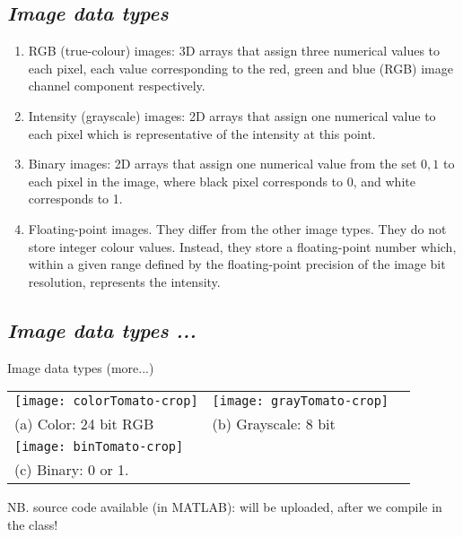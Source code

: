 \documentclass{response}
\begin{document}
\newpage

\subsection*{\Huge\em Image data types }
\bigskip


{\large 
\begin{enumerate}\setlength\itemsep{-0.5em}
\item RGB (true-colour) images: 3D arrays that assign three numerical values to each pixel, each value corresponding to the red, green and blue (RGB) image channel
component respectively. 

\item Intensity (grayscale) images: 2D arrays that assign one numerical value to each pixel which is representative of the intensity at this point. 

\item Binary images: 2D arrays that assign one numerical value from the set ${0,1}$ to each pixel in the image, where black pixel corresponds to 0, and white corresponds to 1.

\item Floating-point images. They differ from the other image types. They do not store integer colour values. Instead, they store a floating-point number which, within a given range defined by the floating-point precision of the image bit resolution, represents the intensity.
\end{enumerate}

}


\newpage

\subsection*{\Huge\em Image data types ... }
\bigskip


{\large 

Image data types (more...)

\begin{tabular}{lll}
\texttt{[image: colorTomato-crop]} &
\texttt{[image: grayTomato-crop]} \\
(a) Color: 24 bit RGB & (b) Grayscale: 8 bit \\
\texttt{[image: binTomato-crop]}\\
(c) Binary: 0 or 1.
\end{tabular}

\vfill
NB. source code available (in MATLAB): will be uploaded, after we compile in the class!

}
\end{document}
